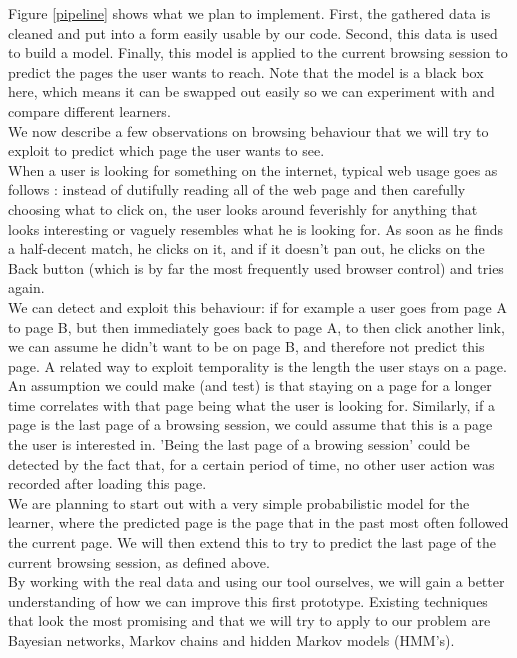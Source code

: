 \documentclass[a4paper,10pt]{article}
\begin{document}
\noindent Figure \ref{pipeline} shows what we plan to implement. First, the gathered data is cleaned and put into a form easily usable by our code. Second, this data is used to build a model. Finally, this model is applied to the current browsing session to predict the pages the user wants to reach. Note that the model is a black box here, which means it can be swapped out easily so we can experiment with and compare different learners.\\

\noindent We now describe a few observations on browsing behaviour that we will try to exploit to predict which page the user wants to see.\\

\noindent When a user is looking for something on the internet, typical web usage goes as follows \cite{krug}: instead of dutifully reading all of the web page and then carefully choosing what to click on, the user looks around feverishly for anything that looks interesting or vaguely resembles what he is looking for. As soon as he finds a half-decent match, he clicks on it, and if it doesn't pan out, he clicks on the Back button (which is by far the most frequently used browser control) and tries again.\\

\noindent We can detect and exploit this behaviour: if for example a user goes from page A to page B, but then immediately goes back to page A, to then click another link, we can assume he didn't want to be on page B, and therefore not predict this page. A related way to exploit temporality is the length the user stays on a page. An assumption we could make (and test) is that staying on a page for a longer time correlates with that page being what the user is looking for. Similarly, if a page is the last page of a browsing session, we could assume that this is a page the user is interested in. 'Being the last page of a browing session' could be detected by the fact that, for a certain period of time, no other user action was recorded after loading this page.\\

\noindent We are planning to start out with a very simple probabilistic model for the learner, where the predicted page is the page that in the past most often followed the current page. We will then extend this to try to predict the last page of the current browsing session, as defined above.\\

\noindent By working with the real data and using our tool ourselves, we will gain a better understanding of how we can improve this first prototype. Existing techniques that look the most promising and that we will try to apply to our problem are Bayesian networks, Markov chains and hidden Markov models (HMM's).\\
\end{document}
